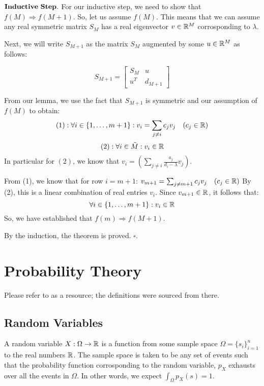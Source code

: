 $\bf Inductive \,\, Step.$ For our inductive step, we need to show that $f(M) \Rightarrow f(M+1)$. So, let us assume $f(M)$. This means that we can assume any real symmetric matrix $S_M$ has a real eigenvector $v \in \mathbb{R}^M$ corrosponding to $\lambda$.

Next, we will write $S_{M+1}$ as the matrix $S_M$ augmented by some $u \in \mathbb{R}^M$ as follows:

$$ S_{M+1} =
\left[
  \begin{array}{c|c}
  S_M & u\\
  \hline
  u^T & d_{M+1}
\end{array} \right]$$

From our lemma, we use the fact that $S_{M+1}$ is symmetric and our assumption of $f(M)$ to obtain:
$$(1): \forall i \in \{1,\dots,m+1\}: v_i =  {\sum_{j \neq i} c_j v_j} \quad (c_j \in \mathbb{R})$$
$$(2): \forall i \in \tilde{M} : v_i \in \mathbb{R}$$
In particular for $(2)$, we know that $v_i = \left({\sum_{j \neq i} \frac{a_j}{d_i-\lambda} v_j}\right)$.


From (1), we know that for row $i = m+1$:
$v_{m+1} =  {\sum_{j \neq {m+1}} c_j v_j} \quad (c_j \in \mathbb{R})$
By (2), this is a linear combination of real entries $v_i$. Since $v_{m+1} \in \mathbb{R}$, it follows that:
$$\forall i \in \{1,\dots,m+1\}: v_i \in \mathbb{R}$$
So, we have established that $f(m) \Rightarrow f(M+1)$.

By the induction, the theorem is proved. $\square$.


\newpage
\section{Probability Theory}

Please refer to \cite{blitz} as a resource; the definitions were sourced from there.

\subsection{Random Variables}

\begin{definition}
A random variable $X: \Omega \to \mathbb{R}$ is a function from some sample space $\Omega = \{s_i\}_{i=1}^n$ to the real numbers $\mathbb{R}$. The sample space is taken to be any set of events such that the probability function corrosponding to the random variable, $p_X$ exhausts over all the events in $\Omega$. In other words, we expect $\int_\Omega p_X(s) = 1$.
\end{definition}

